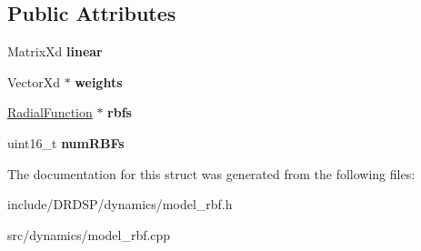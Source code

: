 \subsection*{Public Attributes}
\begin{DoxyCompactItemize}
\item 
\hypertarget{struct_d_r_d_s_p_1_1_model_r_b_f_a295c1bdd680acbc4dce1ae1b7ae2743d}{Matrix\-Xd {\bfseries linear}}\label{struct_d_r_d_s_p_1_1_model_r_b_f_a295c1bdd680acbc4dce1ae1b7ae2743d}

\item 
\hypertarget{struct_d_r_d_s_p_1_1_model_r_b_f_af487cf67bfa20fac1153f115526cd637}{Vector\-Xd $\ast$ {\bfseries weights}}\label{struct_d_r_d_s_p_1_1_model_r_b_f_af487cf67bfa20fac1153f115526cd637}

\item 
\hypertarget{struct_d_r_d_s_p_1_1_model_r_b_f_a8022160fcd8b300a8dac26aaba154c55}{\hyperlink{struct_d_r_d_s_p_1_1_radial_function}{Radial\-Function} $\ast$ {\bfseries rbfs}}\label{struct_d_r_d_s_p_1_1_model_r_b_f_a8022160fcd8b300a8dac26aaba154c55}

\item 
\hypertarget{struct_d_r_d_s_p_1_1_model_r_b_f_aabf99925c656c768e46f1ddd5096f2d5}{uint16\-\_\-t {\bfseries num\-R\-B\-Fs}}\label{struct_d_r_d_s_p_1_1_model_r_b_f_aabf99925c656c768e46f1ddd5096f2d5}

\end{DoxyCompactItemize}


The documentation for this struct was generated from the following files\-:\begin{DoxyCompactItemize}
\item 
include/\-D\-R\-D\-S\-P/dynamics/model\-\_\-rbf.\-h\item 
src/dynamics/model\-\_\-rbf.\-cpp\end{DoxyCompactItemize}
